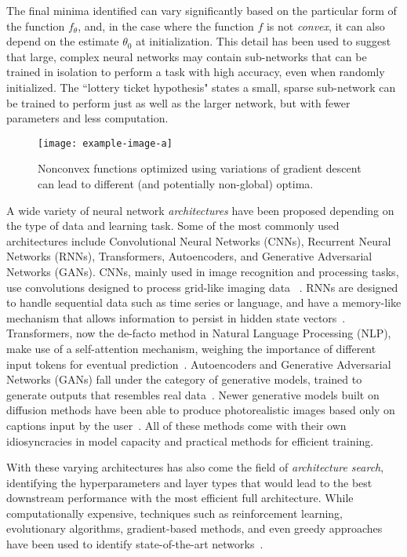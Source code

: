 The final minima identified 
can vary significantly based on 
the particular form of the function $f_\theta$, 
and, in the case where the function $f$ is not \textit{convex}, 
it can also depend on the estimate $\theta_0$ at initialization.
This detail has been used to suggest
that large, complex neural networks 
may contain sub-networks that can be trained in isolation
to perform a task with high accuracy,
even when randomly initialized.
The ``lottery ticket hypothesis" states 
a small, sparse sub-network can be trained to perform just as well as the larger network, 
but with fewer parameters and less computation.
\begin{figure}
	\texttt{[image: example-image-a]}
	\caption[Initialization importance in nonconvex problems]{Nonconvex functions optimized using variations of gradient descent can lead to different (and potentially non-global) optima.}
\end{figure}

A wide variety of neural network \textit{architectures}
have been proposed depending on the type of data and learning task.
Some of the most commonly used architectures include
Convolutional Neural Networks (CNNs), Recurrent Neural Networks (RNNs),
Transformers, Autoencoders, and Generative Adversarial Networks (GANs).
CNNs, mainly used in image recognition and processing tasks,
use convolutions designed to process grid-like imaging data ~\citep{abc}. 
RNNs are designed to handle sequential data such as time series or language,
and have a memory-like mechanism that allows information to persist in hidden state vectors~\citep{abc}. 
Transformers, now the de-facto method in Natural Language Processing (NLP),
make use of a self-attention mechanism,
weighing the importance of different input tokens for eventual prediction~\citep{abc}. 
Autoencoders and Generative Adversarial Networks (GANs) fall under the category of generative models,
trained to generate outputs that resembles real data~\citep{abc}. 
Newer generative models built on diffusion methods have 
been able to produce photorealistic images based
only on captions input by the user~\citep{abc}.
All of these methods come with their own
idiosyncracies in model capacity and practical
methods for efficient training.

With these varying architectures
has also come the field of \textit{architecture search},
identifying the hyperparameters and layer types
that would lead to the best downstream performance
with the most efficient full architecture.
While computationally expensive, techniques
such as reinforcement learning, evolutionary algorithms,
gradient-based methods, and even greedy approaches
have been used to identify state-of-the-art networks~\citep{abc}.

